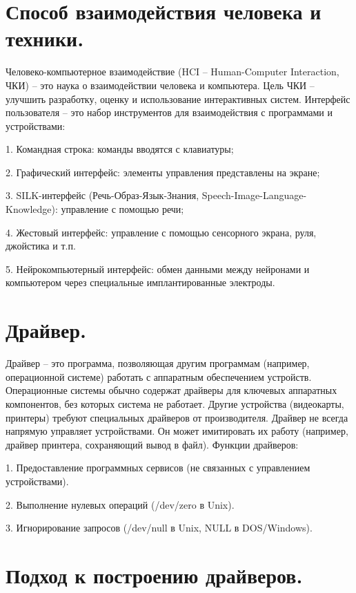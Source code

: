 \documentclass[14pt]{extarticle} %
\begin{document}
\section{Способ взаимодействия человека и техники.} \label{sec:eight}

Человеко-компьютерное взаимодействие (HCI – Human-Computer Interaction, ЧКИ) – это наука о взаимодействии человека и компьютера. Цель ЧКИ – улучшить разработку, оценку и использование интерактивных систем.
Интерфейс пользователя – это набор инструментов для взаимодействия с программами и устройствами:

1.	Командная строка: команды вводятся с клавиатуры;

2.	Графический интерфейс: элементы управления представлены на экране;

3.	SILK-интерфейс (Речь-Образ-Язык-Знания, Speech-Image-Language-Knowledge): управление с помощью речи;

4.	Жестовый интерфейс: управление с помощью сенсорного экрана, руля, джойстика и т.п.

5.	Нейрокомпьютерный интерфейс: обмен данными между нейронами и компьютером через специальные имплантированные электроды.

\section{Драйвер.} \label{sec:nine}

Драйвер – это программа, позволяющая другим программам (например, операционной системе) работать с аппаратным обеспечением устройств.
Операционные системы обычно содержат драйверы для ключевых аппаратных компонентов, без которых система не работает. Другие устройства (видеокарты, принтеры) требуют специальных драйверов от производителя.
Драйвер не всегда напрямую управляет устройствами. Он может имитировать их работу (например, драйвер принтера, сохраняющий вывод в файл).
Функции драйверов:

1.	Предоставление программных сервисов (не связанных с управлением устройствами).

2.	Выполнение нулевых операций (/dev/zero в Unix).

3.	Игнорирование запросов (/dev/null в Unix, NULL в DOS/Windows).

\section{Подход к построению драйверов.} \label{sec:ten}
\end{document}
